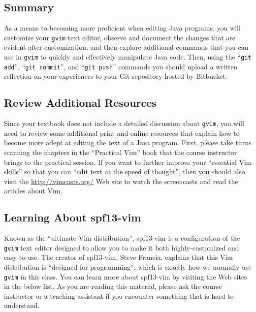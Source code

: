 


\vspace*{-.25in}
\subsection*{Summary}
\vspace*{-.05in}

As a means to becoming more proficient when editing Java programs, you will customize your {\tt gvim} text editor,
observe and document the changes that are evident after customization, and then explore additional commands that you can
use in {\tt gvim} to quickly and effectively manipulate Java code.  Then, using the ``{\tt git add}'', ``{\tt git
  commit}'', and ``{\tt git push}'' commands you should upload a written reflection on your experiences to your Git
repository hosted by Bitbucket.

\vspace*{-.15in}
\subsection*{Review Additional Resources}
\vspace*{-.05in}

Since your textbook does not include a detailed discussion about {\tt gvim}, you will need to review some additional print
and online resources that explain how to become more adept at editing the text of a Java program.  First, please take
turns scanning the chapters in the ``Practical Vim'' book that the course instructor brings to the practical session. If
you want to further improve your ``essential Vim skills'' so that you can ``edit text at the speed of thought'', then
you should also visit the \url{http://vimcasts.org/} Web site to watch the screencasts and read the articles about Vim.

\vspace*{-.15in}
\subsection*{Learning About spf13-vim}
\vspace*{-.05in}

Known as the ``ultimate Vim distribution'', spf13-vim is a configuration of the {\tt gvim} text editor designed to allow
you to make it both highly-customized and easy-to-use.  The creator of spf13-vim, Steve Francia, explains that this Vim
distribution is ``designed for programming'', which is exactly how we normally use {\tt gvim} in this class. You can
learn more about spf13-vim by visiting the Web sites in the below list.  As you are reading this material, please ask
the course instructor or a teaching assistant if you encounter something that is hard to understand.

